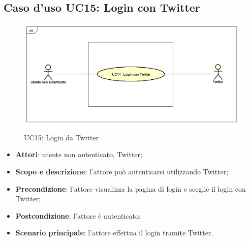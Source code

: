 \newpage
\subsection{Caso d'uso UC15: Login con Twitter}
\label{UC15}
\begin{figure}[ht]
	\centering
	\includegraphics[scale=0.48]{UML/UC15.png}
	\caption{UC15: Login da Twitter}
\end{figure}
\FloatBarrier
\begin{itemize}
	\item \textbf{Attori}: utente non autenticato, Twitter;
	\item \textbf{Scopo e descrizione}: l'attore può autenticarsi utilizzando Twitter;
	\item \textbf{Precondizione}: l'attore visualizza la pagina di login e sceglie il login con Twitter;
	\item \textbf{Postcondizione}: l'attore è autenticato;
	\item \textbf{Scenario principale}: l'attore effettua il login tramite Twitter.
\end{itemize}
